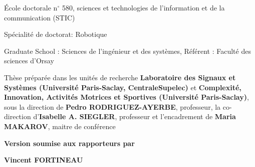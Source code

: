 \documentclass[french,12pt,a4paper]{book}
\begin{document}
\begin{titlepage}
\vspace{6mm}

\fontsize{10}{12}\selectfont
École doctorale n\(^{\circ}\) 580, sciences et technologies de l'information et de la communication (STIC)

Spécialité de doctorat: Robotique

\fontsize{9}{10}\selectfont
Graduate School : Sciences de l'ingénieur et des systèmes, Référent : Faculté des sciences d’Orsay

\vspace{6mm}

\fontsize{10}{12}\selectfont
Thèse préparée dans les unités de recherche \textbf{Laboratoire des Signaux et Systèmes (Université Paris-Saclay, CentraleSupelec)} et \textbf{Complexité, Innovation, Activités Motrices et Sportives (Université Paris-Saclay)}, sous la direction de \textbf{Pedro RODRIGUEZ-AYERBE}, professeur, la co-direction d'\textbf{Isabelle A. SIEGLER}, professeur et l'encadrement de \textbf{Maria MAKAROV}, maitre de conférence

\vspace{1cm}

\fontsize{12}{14}\selectfont
\textbf{Version soumise aux rapporteurs par}

\bigskip
\fontsize{20}{22}\selectfont
{\color{Prune} \textbf{Vincent FORTINEAU}}

\vspace{\fill} %

\bigskip


\end{titlepage}
\end{document}
